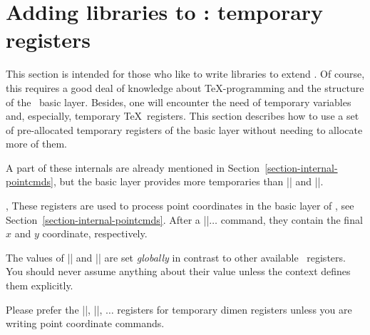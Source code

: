 %
%
%


\section{Adding libraries to \pgfname: temporary registers}
\label{section-internal-registers}

This section is intended for those who like to write libraries to extend
\pgfname. Of course, this requires a good deal of knowledge about
\TeX-programming and the structure of the \pgfname\ basic layer. Besides, one
will encounter the need of temporary variables and, especially, temporary \TeX\
registers. This section describes how to use a set of pre-allocated temporary
registers of the basic layer without needing to allocate more of them.

A part of these internals are already mentioned in
Section~\ref{section-internal-pointcmds}, but the basic layer provides more
temporaries than |\pgf@x| and |\pgf@y|.

\begin{internallist}[dimen register]{\pgf@x,\pgf@y}
    These registers are used to process point coordinates in the basic layer of
    \pgfname, see Section~\ref{section-internal-pointcmds}. After a
    |\pgfpoint|$\dotsc$ command, they contain the final $x$ and $y$ coordinate,
    respectively.

    The values of |\pgf@x| and |\pgf@y| are set \emph{globally} in contrast to
    other available \pgfname\ registers. You should never assume anything about
    their value unless the context defines them explicitly.

    Please prefer the |\pgf@xa|, |\pgf@xb|, $\dotsc$ registers for temporary
    dimen registers unless you are writing point coordinate commands.
\end{internallist}

